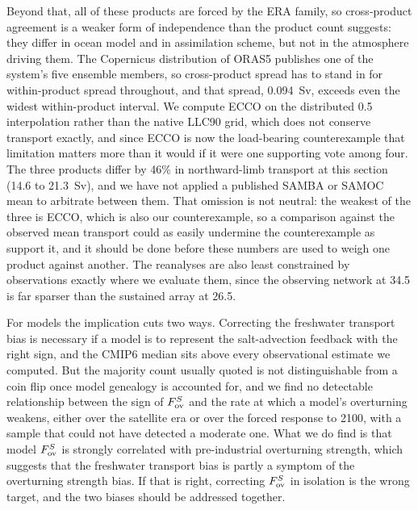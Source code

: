 Beyond that, all of these products are forced by the ERA family, so
cross-product agreement is a weaker form of independence than the product count
suggests: they differ in ocean model and in assimilation scheme, but not in the
atmosphere driving them. The Copernicus distribution of ORAS5 publishes one of
the system's five ensemble members\cite{Zuo2019}, so cross-product spread has to
stand in for within-product spread throughout, and that spread, 0.094~Sv, exceeds even the
widest within-product interval\cite{Jackson2019}. We compute
ECCO on the distributed 0.5\degree{} interpolation rather than the native LLC90
grid, which does not conserve transport exactly, and since ECCO is now the
load-bearing counterexample that limitation matters more than it would if it
were one supporting vote among four. The three products differ by 46\% in northward-limb transport
at this section (14.6 to 21.3~Sv), and we have not applied a published SAMBA or
SAMOC mean to arbitrate between them. That omission is not neutral: the weakest
of the three is ECCO, which is also our counterexample, so a comparison against
the observed mean transport could as easily undermine the counterexample as
support it, and it should be done before these numbers are used to weigh one
product against another. The reanalyses are also least
constrained by observations exactly where we evaluate them, since the observing
network at 34.5\degS{} is far sparser than the sustained array at
26.5\degN{}\cite{Meinen2018,Cunningham2007,GarzoliMatano2011,FrajkaWilliams2019}.

For models the implication cuts two ways. Correcting the freshwater transport
bias is necessary if a model is to represent the salt-advection feedback with
the right sign, and the CMIP6 median sits above every observational estimate we
computed. But the majority count usually quoted is not distinguishable from a
coin flip once model genealogy is accounted for, and we find no detectable
relationship between the sign of $F_{\mathrm{ov}}^{S}$ and the rate at which a model's
overturning weakens, either over the satellite era or over the forced response
to 2100, with a sample that could not have detected a moderate one. What we do
find is that model $F_{\mathrm{ov}}^{S}$ is strongly correlated with pre-industrial
overturning strength, which suggests that the freshwater transport bias is
partly a symptom of the overturning strength bias. If that is right, correcting
$F_{\mathrm{ov}}^{S}$ in isolation is the wrong target, and the two biases should be
addressed together.

